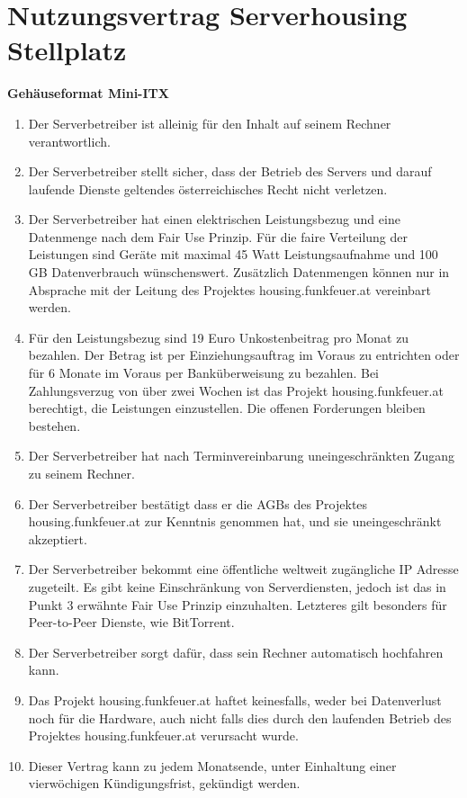 \documentclass[parskip=half]{scrreprt}
\begin{document}
\chapter*{Nutzungsvertrag Serverhousing Stellplatz}
\vspace{-0.8cm}
\textbf{Gehäuseformat Mini-ITX\\}


\begin{contract}
\begin{enumerate}
\item Der Serverbetreiber ist alleinig für den Inhalt auf seinem Rechner verantwortlich.
\item Der Serverbetreiber stellt sicher, dass der Betrieb des Servers und darauf laufende Dienste geltendes österreichisches Recht nicht verletzen.
\item Der Serverbetreiber hat einen elektrischen Leistungsbezug und eine Datenmenge nach dem Fair Use Prinzip. Für die faire Verteilung der Leistungen sind Geräte mit maximal 45 Watt Leistungsaufnahme und 100 GB Datenverbrauch wünschenswert. Zusätzlich Datenmengen können nur in Absprache mit der Leitung des Projektes housing.funkfeuer.at vereinbart werden.
\item Für den Leistungsbezug sind 19 Euro Unkostenbeitrag pro Monat zu bezahlen. Der Betrag ist per Einziehungsauftrag im Voraus zu entrichten oder für 6 Monate im Voraus per Banküberweisung zu bezahlen. Bei Zahlungsverzug von über zwei Wochen ist das Projekt housing.funkfeuer.at berechtigt, die Leistungen einzustellen. Die offenen Forderungen bleiben bestehen.
\item Der Serverbetreiber hat nach Terminvereinbarung uneingeschränkten Zugang zu seinem Rechner.
\item Der Serverbetreiber bestätigt dass er die AGBs des Projektes housing.funkfeuer.at zur Kenntnis genommen hat, und sie uneingeschränkt akzeptiert.
\item Der Serverbetreiber bekommt eine öffentliche weltweit zugängliche IP Adresse zugeteilt. Es gibt keine Einschränkung von Serverdiensten, jedoch ist das in Punkt 3 erwähnte Fair Use Prinzip einzuhalten. Letzteres gilt besonders für Peer-to-Peer Dienste, wie BitTorrent.
\item Der Serverbetreiber sorgt dafür, dass sein Rechner automatisch hochfahren kann.
\item Das Projekt housing.funkfeuer.at haftet keinesfalls, weder bei Datenverlust noch für die Hardware, auch nicht falls dies durch den laufenden Betrieb des Projektes housing.funkfeuer.at verursacht wurde.
\item Dieser Vertrag kann zu jedem Monatsende, unter Einhaltung einer vierwöchigen Kündigungsfrist, gekündigt werden.
\end{enumerate}
\end{contract}




\end{document}
